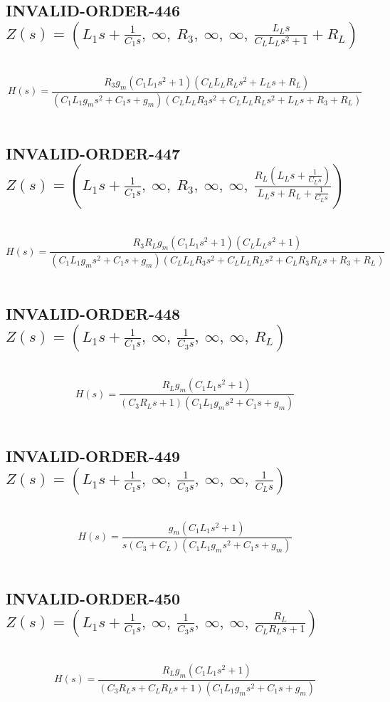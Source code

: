 \documentclass{article}
\begin{document}
\subsection{INVALID-ORDER-446 $Z(s) = \left( L_{1} s + \frac{1}{C_{1} s}, \  \infty, \  R_{3}, \  \infty, \  \infty, \  \frac{L_{L} s}{C_{L} L_{L} s^{2} + 1} + R_{L}\right)$ } \ 
\textbf{\[H(s) = \frac{R_{3} g_{m} \left(C_{1} L_{1} s^{2} + 1\right) \left(C_{L} L_{L} R_{L} s^{2} + L_{L} s + R_{L}\right)}{\left(C_{1} L_{1} g_{m} s^{2} + C_{1} s + g_{m}\right) \left(C_{L} L_{L} R_{3} s^{2} + C_{L} L_{L} R_{L} s^{2} + L_{L} s + R_{3} + R_{L}\right)}\] } \ 
\subsection{INVALID-ORDER-447 $Z(s) = \left( L_{1} s + \frac{1}{C_{1} s}, \  \infty, \  R_{3}, \  \infty, \  \infty, \  \frac{R_{L} \left(L_{L} s + \frac{1}{C_{L} s}\right)}{L_{L} s + R_{L} + \frac{1}{C_{L} s}}\right)$ } \ 
\textbf{\[H(s) = \frac{R_{3} R_{L} g_{m} \left(C_{1} L_{1} s^{2} + 1\right) \left(C_{L} L_{L} s^{2} + 1\right)}{\left(C_{1} L_{1} g_{m} s^{2} + C_{1} s + g_{m}\right) \left(C_{L} L_{L} R_{3} s^{2} + C_{L} L_{L} R_{L} s^{2} + C_{L} R_{3} R_{L} s + R_{3} + R_{L}\right)}\] } \ 
\subsection{INVALID-ORDER-448 $Z(s) = \left( L_{1} s + \frac{1}{C_{1} s}, \  \infty, \  \frac{1}{C_{3} s}, \  \infty, \  \infty, \  R_{L}\right)$ } \ 
\textbf{\[H(s) = \frac{R_{L} g_{m} \left(C_{1} L_{1} s^{2} + 1\right)}{\left(C_{3} R_{L} s + 1\right) \left(C_{1} L_{1} g_{m} s^{2} + C_{1} s + g_{m}\right)}\] } \ 
\subsection{INVALID-ORDER-449 $Z(s) = \left( L_{1} s + \frac{1}{C_{1} s}, \  \infty, \  \frac{1}{C_{3} s}, \  \infty, \  \infty, \  \frac{1}{C_{L} s}\right)$ } \ 
\textbf{\[H(s) = \frac{g_{m} \left(C_{1} L_{1} s^{2} + 1\right)}{s \left(C_{3} + C_{L}\right) \left(C_{1} L_{1} g_{m} s^{2} + C_{1} s + g_{m}\right)}\] } \ 
\subsection{INVALID-ORDER-450 $Z(s) = \left( L_{1} s + \frac{1}{C_{1} s}, \  \infty, \  \frac{1}{C_{3} s}, \  \infty, \  \infty, \  \frac{R_{L}}{C_{L} R_{L} s + 1}\right)$ } \ 
\textbf{\[H(s) = \frac{R_{L} g_{m} \left(C_{1} L_{1} s^{2} + 1\right)}{\left(C_{3} R_{L} s + C_{L} R_{L} s + 1\right) \left(C_{1} L_{1} g_{m} s^{2} + C_{1} s + g_{m}\right)}\] } \ 
\end{document}
